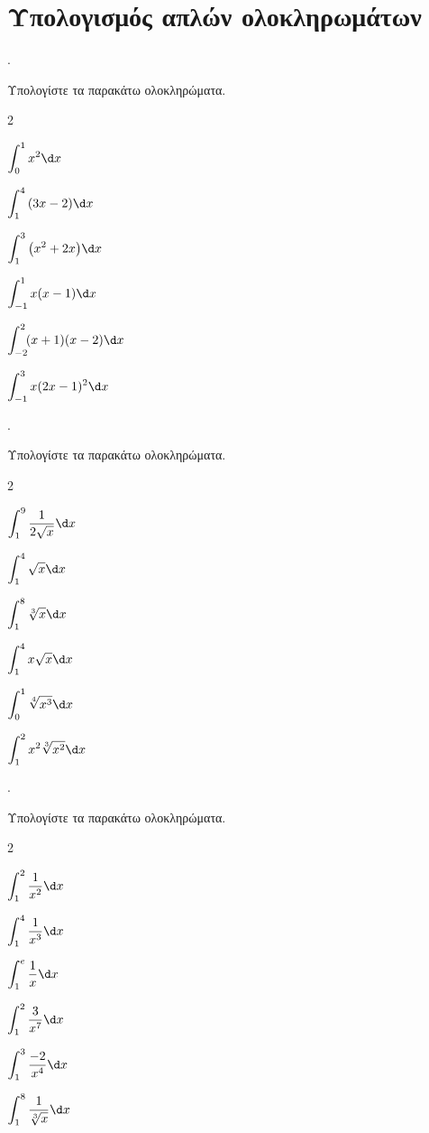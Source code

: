 \documentclass[11pt,a4paper,twocolumn]{article}
\newcounter{askhsh}
\newcommand{\askhsh}{\large\theaskhsh.\ \addtocounter{askhsh}{1}}
\begin{document}
\section{Υπολογισμός απλών ολοκληρωμάτων}
\askhsh Υπολογίστε τα παρακάτω ολοκληρώματα.
\begin{multicols}{2}
\begin{alist}
\item $\displaystyle\int_{0}^{1}{x^2}\d x$
\item $\displaystyle\int_{1}^{4}{\left(3x-2\right)}\d x$
\item $\displaystyle\int_{1}^{3}{\left(x^2+2x\right)}\d x$
\item $\displaystyle\int_{-1}^{1}{x(x-1)}\d x$
\item $\displaystyle\int_{-2}^{2}{\!\!(x+1)(x-2)}\d x$
\item $\displaystyle\int_{-1}^{3}{x(2x-1)^2}\d x$
\end{alist}
\end{multicols}
\askhsh Υπολογίστε τα παρακάτω ολοκληρώματα.
\begin{multicols}{2}
\begin{alist}
\item $\displaystyle\int_{1}^{9}{\dfrac{1}{2\sqrt{x}}}\d x$
\item $\displaystyle\int_{1}^{4}{\sqrt{x}}\d x$
\item $\displaystyle\int_{1}^{8}{\sqrt[3]{x}}\d x$
\item $\displaystyle\int_{1}^{4}{x\sqrt{x}}\d x$
\item $\displaystyle\int_{0}^{1}{\sqrt[4]{x^3}}\d x$
\item $\displaystyle\int_{1}^{2}{x^2\sqrt[3]{x^2}}\d x$
\end{alist}
\end{multicols}
\askhsh Υπολογίστε τα παρακάτω ολοκληρώματα.
\begin{multicols}{2}
\begin{alist}
\item $\displaystyle\int_{1}^{2}{\dfrac{1}{x^2}}\d x$
\item $\displaystyle\int_{1}^{4}{\dfrac{1}{x^3}}\d x$
\item $\displaystyle\int_{1}^{e}{\dfrac{1}{x}}\d x$
\item $\displaystyle\int_{1}^{2}{\dfrac{3}{x^7}}\d x$
\item $\displaystyle\int_{1}^{3}{\dfrac{-2}{x^4}}\d x$
\item $\displaystyle\int_{1}^{8}{\dfrac{1}{\sqrt[3]{x}}}\d x$
\end{alist}
\end{multicols}
\end{document}
